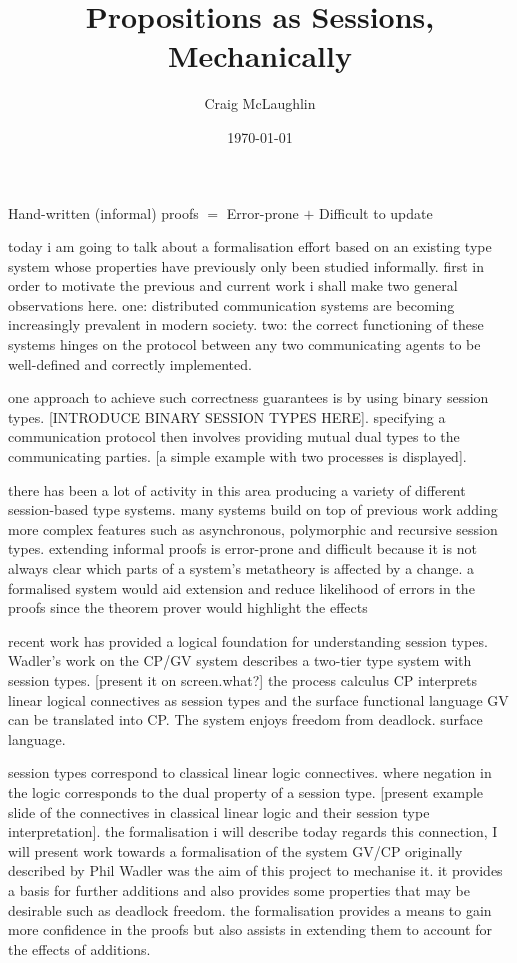 \documentclass{beamer}
\title[Project Presentation]{Propositions as Sessions, Mechanically}
\author{Craig McLaughlin}
\institute{University Of Glasgow}
\date{\today}
\begin{document}
\begin{frame}
\titlepage
\end{frame}

\begin{frame}
Hand-written (informal) proofs $=$ Error-prone $+$ Difficult to update
\end{frame}

today i am going to talk about a formalisation effort based on an existing
type system whose properties have previously only been studied
informally. first in order to motivate the previous and current work i shall
make two general observations here. one: distributed communication systems are
becoming increasingly prevalent in modern society. two: the correct
functioning of these systems hinges on the protocol between any two
communicating agents to be well-defined and correctly implemented.

one approach to achieve such correctness guarantees is by using binary session
types. [INTRODUCE BINARY SESSION TYPES HERE]. specifying a communication
protocol then involves providing mutual dual types to the communicating
parties. [a simple example with two processes is displayed].

there has been a lot of activity in this area producing a variety of different
session-based type systems. many systems build on top of previous work adding
more complex features such as asynchronous, polymorphic and recursive session
types. extending informal proofs is error-prone and difficult because it is
not always clear which parts of a system's metatheory is affected by a
change. a formalised system would aid extension and reduce likelihood
of errors in the proofs since the theorem prover would highlight the effects

recent work has provided a logical foundation for understanding session
types. Wadler's work on the CP/GV system describes a two-tier type system with
session types. [present it on screen.what?] the process calculus CP interprets
linear logical connectives as session types and the surface functional
language GV can be translated into CP. The system enjoys freedom from
deadlock. surface language.

session types correspond to classical linear logic connectives. where negation
in the logic corresponds to the dual property of a session type. [present
  example slide of the connectives in classical linear logic and their session
  type interpretation]. the formalisation i will describe today regards this
connection, I will present work towards a formalisation of the system GV/CP
originally described by Phil Wadler was the aim of this project to mechanise
it. it provides a basis for further additions and also provides some
properties that may be desirable such as deadlock freedom. the formalisation
provides a means to gain more confidence in the proofs but also assists in
extending them to account for the effects of additions.
\end{document}
